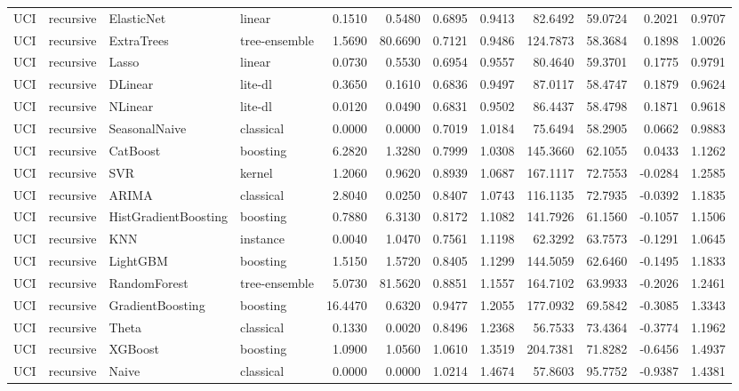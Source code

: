 \begin{tabular}{llllrrrrrrrr}
UCI & recursive & ElasticNet & linear & 0.1510 & 0.5480 & 0.6895 & 0.9413 & 82.6492 & 59.0724 & 0.2021 & 0.9707 \\
UCI & recursive & ExtraTrees & tree-ensemble & 1.5690 & 80.6690 & 0.7121 & 0.9486 & 124.7873 & 58.3684 & 0.1898 & 1.0026 \\
UCI & recursive & Lasso & linear & 0.0730 & 0.5530 & 0.6954 & 0.9557 & 80.4640 & 59.3701 & 0.1775 & 0.9791 \\
UCI & recursive & DLinear & lite-dl & 0.3650 & 0.1610 & 0.6836 & 0.9497 & 87.0117 & 58.4747 & 0.1879 & 0.9624 \\
UCI & recursive & NLinear & lite-dl & 0.0120 & 0.0490 & 0.6831 & 0.9502 & 86.4437 & 58.4798 & 0.1871 & 0.9618 \\
UCI & recursive & SeasonalNaive & classical & 0.0000 & 0.0000 & 0.7019 & 1.0184 & 75.6494 & 58.2905 & 0.0662 & 0.9883 \\
UCI & recursive & CatBoost & boosting & 6.2820 & 1.3280 & 0.7999 & 1.0308 & 145.3660 & 62.1055 & 0.0433 & 1.1262 \\
UCI & recursive & SVR & kernel & 1.2060 & 0.9620 & 0.8939 & 1.0687 & 167.1117 & 72.7553 & -0.0284 & 1.2585 \\
UCI & recursive & ARIMA & classical & 2.8040 & 0.0250 & 0.8407 & 1.0743 & 116.1135 & 72.7935 & -0.0392 & 1.1835 \\
UCI & recursive & HistGradientBoosting & boosting & 0.7880 & 6.3130 & 0.8172 & 1.1082 & 141.7926 & 61.1560 & -0.1057 & 1.1506 \\
UCI & recursive & KNN & instance & 0.0040 & 1.0470 & 0.7561 & 1.1198 & 62.3292 & 63.7573 & -0.1291 & 1.0645 \\
UCI & recursive & LightGBM & boosting & 1.5150 & 1.5720 & 0.8405 & 1.1299 & 144.5059 & 62.6460 & -0.1495 & 1.1833 \\
UCI & recursive & RandomForest & tree-ensemble & 5.0730 & 81.5620 & 0.8851 & 1.1557 & 164.7102 & 63.9933 & -0.2026 & 1.2461 \\
UCI & recursive & GradientBoosting & boosting & 16.4470 & 0.6320 & 0.9477 & 1.2055 & 177.0932 & 69.5842 & -0.3085 & 1.3343 \\
UCI & recursive & Theta & classical & 0.1330 & 0.0020 & 0.8496 & 1.2368 & 56.7533 & 73.4364 & -0.3774 & 1.1962 \\
UCI & recursive & XGBoost & boosting & 1.0900 & 1.0560 & 1.0610 & 1.3519 & 204.7381 & 71.8282 & -0.6456 & 1.4937 \\
UCI & recursive & Naive & classical & 0.0000 & 0.0000 & 1.0214 & 1.4674 & 57.8603 & 95.7752 & -0.9387 & 1.4381 \\

\end{tabular}
